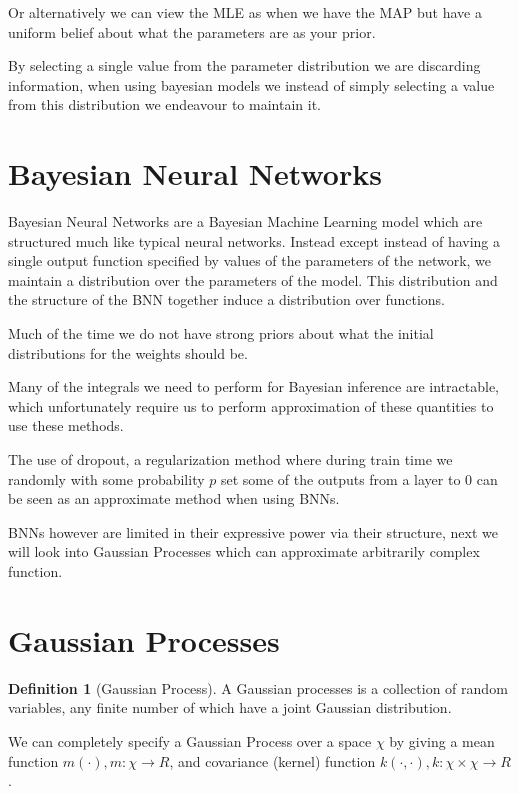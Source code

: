 \documentclass[12pt, a4paper]{report}
\theoremstyle{definition}
\theoremstyle{definition}
\newtheorem{definition}{Definition}[section]
\theoremstyle{definition}
\begin{document}
Or alternatively we can view the MLE as when we have the MAP but have a uniform belief about what the parameters are as your prior.

By selecting a single value from the parameter distribution we are discarding information, when using bayesian models we instead of simply selecting a value from this distribution we endeavour to maintain it.


\section{Bayesian Neural Networks}
\label{sec:BNNs}


Bayesian Neural Networks are a Bayesian Machine Learning model which are structured much like typical neural networks. Instead except instead of having a single output function specified by values of the parameters of the network, we maintain a distribution over the parameters of the model. This distribution and the structure of the BNN together induce a distribution over functions.

Much of the time we do not have strong priors about what the initial distributions for the weights should be.

Many of the integrals we need to perform for Bayesian inference are intractable, which unfortunately require us to perform approximation of these quantities to use these methods.

The use of dropout, a regularization method where during train time we randomly with some probability $p$ set some of the outputs from a layer to 0 can be seen as an approximate method when using BNNs. \cite{gal2016dropout}

BNNs however are limited in their expressive power via their structure, next we will look into Gaussian Processes which can approximate arbitrarily \cite{} complex function.

\section{Gaussian Processes}
\label{sec:GaussianProcesses}


\begin{definition}[Gaussian Process]
    A Gaussian processes is a collection of random variables, any finite number of which have a joint Gaussian distribution. \cite{rasmussen2003gaussian}
\end{definition}


We can completely specify a Gaussian Process over a space $\chi$ by giving a mean function $m(\cdot), m : \chi \rightarrow R$, and covariance (kernel) function $k(\cdot, \cdot), k: \chi \times \chi \rightarrow R$.
\end{document}
